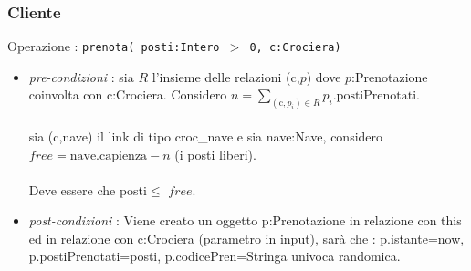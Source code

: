 \documentclass[12pt, letterpaper]{article}
\newcommand{\acc}{\\\hphantom{}\\}
\newcommand{\code}[1]{\colorbox{light-gray}{\texttt{#1}}}
\begin{document}
\subsubsection{Cliente}
Operazione : \code{prenota( posti:Intero $>$ 0, c:Crociera)}\begin{itemize}
    \item \textit{pre-condizioni} : sia $R$ l'insieme delle relazioni (c,$p$) dove 
    $p$:Prenotazione coinvolta con c:Crociera. Considero $n=\displaystyle\sum_{(\text{c},p_i)\in R}p_i.\text{postiPrenotati}$.\acc 
    sia (c,nave) il link di tipo croc\_nave e sia nave:Nave, considero $free=\text{nave.capienza}-n$ (i posti liberi). \acc 
    Deve essere che posti$\le$ $free$.
    \item \textit{post-condizioni} : Viene creato un oggetto p:Prenotazione in relazione con this ed in relazione con 
    c:Crociera (parametro in input), sarà che : p.istante=now, p.postiPrenotati=posti, p.codicePren=Stringa univoca randomica.
\end{itemize}
\end{document}
